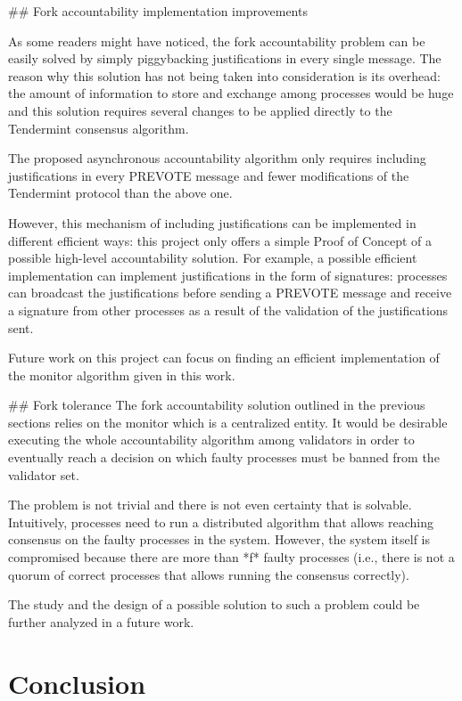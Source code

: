 \documentclass[a4paper,11pt,oneside]{report}
\begin{document}
\begin{markdown}
## Fork accountability implementation improvements

As some readers might have noticed, the fork accountability problem can be easily solved by simply piggybacking justifications in every single message.
The reason why this solution has not being taken into consideration is its overhead: the amount of information to store and exchange among processes would be huge and this solution requires several changes to be applied directly to the Tendermint consensus algorithm. 

The proposed asynchronous accountability algorithm only requires including justifications in every PREVOTE message and fewer modifications of the Tendermint protocol than the above one.

However, this mechanism of including justifications can be implemented in different efficient ways: this project only offers a simple Proof of Concept of a possible high-level accountability solution.
For example, a possible efficient implementation can implement justifications in the form of signatures: processes can broadcast the justifications before sending a PREVOTE message and receive a signature from other processes as a result of the validation of the justifications sent.

Future work on this project can focus on finding an efficient implementation of the monitor algorithm given in this work.  


## Fork tolerance
The fork accountability solution outlined in the previous sections relies on the monitor which is a centralized entity. It would be desirable executing the whole accountability algorithm among validators in order to eventually reach a decision on which faulty processes must be banned from the validator set.

The problem is not trivial and there is not even certainty that is solvable. 
Intuitively, processes need to run a distributed algorithm that allows reaching consensus on the faulty processes in the system.
However, the system itself is compromised because there are more than *f* faulty processes (i.e., there is not a quorum of correct processes that allows running the consensus correctly).

The study and the design of a possible solution to such a problem could be further analyzed in a future work.


\end{markdown}


\chapter{Conclusion}
\end{document}
